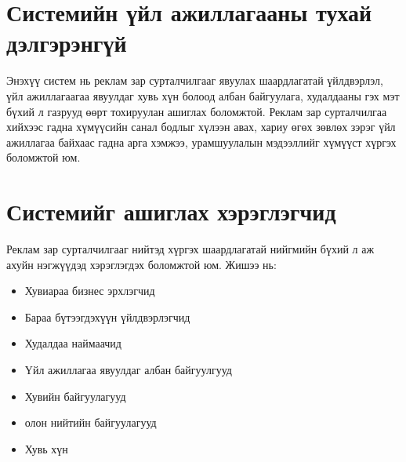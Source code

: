 
\label{Chapter2} %

\section{Системийн үйл ажиллагааны тухай дэлгэрэнгүй }
Энэхүү систем нь реклам зар сурталчилгааг явуулах шаардлагатай үйлдвэрлэл, үйл ажиллагаагаа явуулдаг хувь хүн болоод албан байгуулага, худалдааны гэх мэт бүхий л газрууд өөрт тохируулан ашиглах боломжтой. Реклам зар сурталчилгаа хийхээс гадна хүмүүсийн санал бодлыг хүлээн авах, хариу өгөх зөвлөх зэрэг үйл ажиллагаа байхаас гадна арга хэмжээ, урамшуулалын мэдээллийг хүмүүст хүргэх боломжтой юм.

\section{Системийг ашиглах хэрэглэгчид}
Реклам зар сурталчилгааг нийтэд хүргэх шаардлагатай нийгмийн бүхий л аж ахуйн нэгжүүдэд хэрэглэгдэх боломжтой юм.
Жишээ нь: 
\begin{itemize}
\item Хувиараа бизнес эрхлэгчид
\item Бараа бүтээгдэхүүн үйлдвэрлэгчид
\item Худалдаа наймаачид	
\item Үйл ажиллагаа явуулдаг албан байгуулгууд
\item Хувийн байгуулагууд
\item олон нийтийн байгуулагууд
\item Хувь хүн
\end{itemize}
